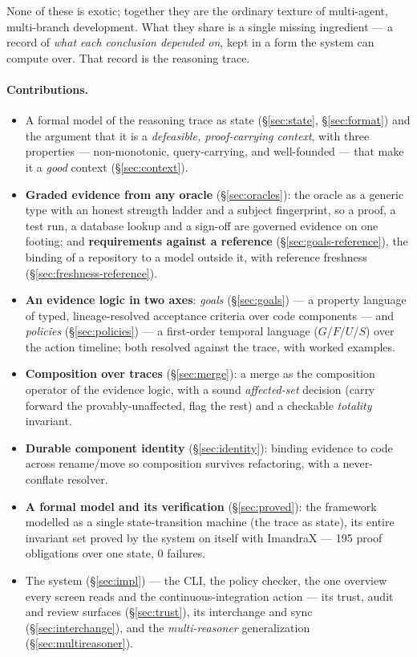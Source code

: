 \documentclass[11pt]{article}
\begin{document}
None of these is exotic; together they are the ordinary texture of multi-agent, multi-branch development. What
they share is a single missing ingredient --- a record of \emph{what each conclusion depended on}, kept in a
form the system can compute over. That record is the reasoning trace.

\paragraph{Contributions.}
\begin{itemize}
\item A formal model of the reasoning trace as state (\S\ref{sec:state}, \S\ref{sec:format}) and the
argument that it is a \emph{defeasible, proof-carrying context}, with three properties --- non-monotonic,
query-carrying, and well-founded --- that make it a \emph{good} context (\S\ref{sec:context}).
\item \textbf{Graded evidence from any oracle} (\S\ref{sec:oracles}): the oracle as a generic type with an
honest strength ladder and a subject fingerprint, so a proof, a test run, a database lookup and a sign-off are
governed evidence on one footing; and \textbf{requirements against a reference} (\S\ref{sec:goals-reference}),
the binding of a repository to a model outside it, with reference freshness (\S\ref{sec:freshness-reference}).
\item \textbf{An evidence logic in two axes}: \emph{goals}
(\S\ref{sec:goals}) --- a property language of typed, lineage-resolved acceptance criteria over code
components --- and \emph{policies} (\S\ref{sec:policies}) --- a first-order temporal language ($G$/$F$/$U$/$S$)
over the action timeline; both resolved against the trace, with worked examples.
\item \textbf{Composition over traces} (\S\ref{sec:merge}): a merge as the composition operator of the
evidence logic, with a sound \emph{affected-set} decision (carry forward the provably-unaffected, flag the
rest) and a checkable \emph{totality} invariant.
\item \textbf{Durable component identity} (\S\ref{sec:identity}): binding evidence to code across
rename/move so composition survives refactoring, with a never-conflate resolver.
\item \textbf{A formal model and its verification} (\S\ref{sec:proved}): the framework modelled as a single
state-transition machine (the trace as state), its entire invariant set proved by the system on itself with
ImandraX --- 195 proof obligations over one state, 0 failures.
\item The system (\S\ref{sec:impl}) --- the CLI, the policy checker, the one overview every screen reads
and the continuous-integration action --- its trust, audit and review surfaces (\S\ref{sec:trust}), its
interchange and sync (\S\ref{sec:interchange}), and the \emph{multi-reasoner} generalization
(\S\ref{sec:multireasoner}).
\end{itemize}
\end{document}
